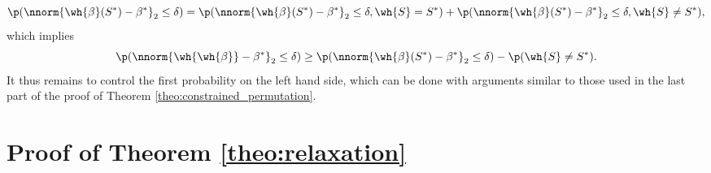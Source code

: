 \documentclass[11pt]{article}
\begin{document}
\begin{equation*}
\p(\nnorm{\wh{\beta}(S^*) - \beta^*}_2 \leq \delta) = \p(\nnorm{\wh{\beta}(S^*) - \beta^*}_2 \leq \delta, \wh{S} = S^*) + 
\p(\nnorm{\wh{\beta}(S^*) - \beta^*}_2 \leq \delta, \wh{S} \neq S^*),
\end{equation*} 
which implies 
\begin{equation*}
\p(\nnorm{\wh{\wh{\beta}} - \beta^*}_2 \leq \delta) \geq \p(\nnorm{\wh{\beta}(S^*) - \beta^*}_2 \leq \delta) - \p(\wh{S} \neq S^*). 
\end{equation*}
It thus remains to control the first probability on the left hand side, which can be done with arguments similar 
to those used in the last part of the proof of Theorem \ref{theo:constrained_permutation}.

 


\section{Proof of Theorem \ref{theo:relaxation}}\label{app:theo:relaxation}
\end{document}
